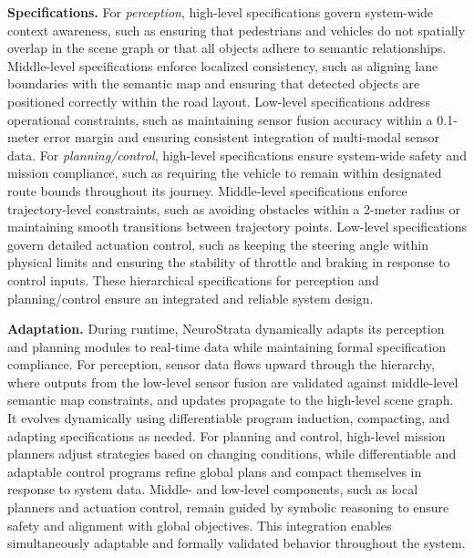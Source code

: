 \textbf{Specifications.} 
For \textit{perception}, high-level specifications govern system-wide context awareness, such as ensuring that pedestrians and vehicles do not spatially overlap in the scene graph or that all objects adhere to semantic relationships. Middle-level specifications enforce localized consistency, such as aligning lane boundaries with the semantic map and ensuring that detected objects are positioned correctly within the road layout. Low-level specifications address operational constraints, such as maintaining sensor fusion accuracy within a 0.1-meter error margin and ensuring consistent integration of multi-modal sensor data. For \textit{planning/control}, high-level specifications ensure system-wide safety and mission compliance, such as requiring the vehicle to remain within designated route bounds throughout its journey. Middle-level specifications enforce trajectory-level constraints, such as avoiding obstacles within a 2-meter radius or maintaining smooth transitions between trajectory points. Low-level specifications govern detailed actuation control, such as keeping the steering angle within physical limits and ensuring the stability of throttle and braking in response to control inputs. 
These hierarchical specifications for perception and planning/control ensure an integrated and reliable system design.

\textbf{Adaptation.} 
During runtime, NeuroStrata dynamically adapts its perception and planning modules to real-time data while maintaining formal specification compliance. For perception, sensor data flows upward through the hierarchy, where outputs from the low-level sensor fusion are validated against middle-level semantic map constraints, and updates propagate to the high-level scene graph. It evolves dynamically using differentiable program induction, compacting, and adapting specifications as needed. For planning and control, high-level mission planners adjust strategies based on changing conditions, while differentiable and adaptable control programs refine global plans and compact themselves in response to system data. Middle- and low-level components, such as local planners and actuation control, remain guided by symbolic reasoning to ensure safety and alignment with global objectives. This integration enables simultaneously adaptable and formally validated behavior throughout the system.


